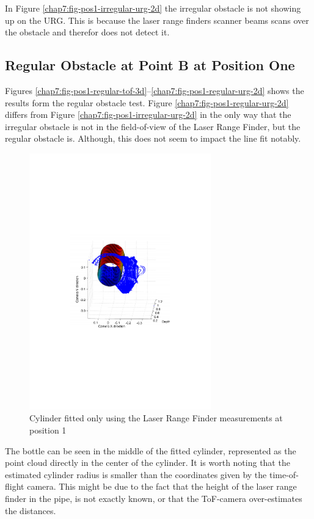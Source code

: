 In Figure \ref{chap7:fig-pos1-irregular-urg-2d} the irregular obstacle is not showing up
on the URG. This is because the laser range finders scanner beams scans over the obstacle
and therefor does not detect it. 


\subsection{Regular Obstacle at Point B at Position One}
Figures \ref{chap7:fig-pos1-regular-tof-3d}--\ref{chap7:fig-pos1-regular-urg-2d} shows the
results form the regular obstacle test. Figure \ref{chap7:fig-pos1-regular-urg-2d} differs
from Figure \ref{chap7:fig-pos1-irregular-urg-2d} in the only way that the irregular
obstacle is not in the field-of-view of the Laser Range Finder, but the regular obstacle
is. Although, this does not seem to impact the line fit notably. 
\begin{figure}[htbp]
    \centering
    \includegraphics[width=0.7\textwidth]{pics/pos1-regular-urg-3d}
    \caption{Cylinder fitted only using the Laser Range Finder measurements at position 1}
    \label{chap7:fig-pos1-regular-urg-3d}
\end{figure}
The bottle can be seen in the middle of the fitted cylinder, represented as the point
cloud directly in the center of the cylinder. It is worth noting that the estimated
cylinder radius is smaller than the coordinates given by the time-of-flight camera. This
might be due to the fact that the height of the laser range finder in the pipe, is not
exactly known, or that the ToF-camera over-estimates the distances. 

